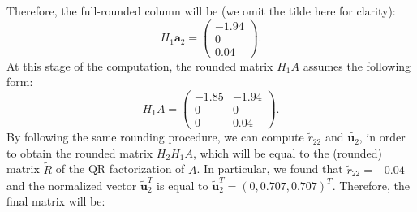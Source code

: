 \documentclass[a4paper,11pt]{article}
\begin{document}
Therefore, the full-rounded column will be (we omit the tilde here for clarity):
\begin{equation}
	H_1 \textbf{a}_2  =
	\begin{pmatrix}
		-1.94\\
		0\\
		0.04
	\end{pmatrix}.
\end{equation}
At this stage of the computation, the rounded matrix $H_{1}A$ assumes the following form:
\begin{equation}\label{key}
	H_1 A = \begin{pmatrix}
		-1.85& -1.94 \\
		0& 0  \\
		0& 0.04
	\end{pmatrix}. 
\end{equation}
By following the same rounding procedure, we can compute $\tilde{r}_{22}$ and $\tilde{\textbf{u}_{2}}$, in order to obtain the rounded matrix $H_{2}H_{1}A$, which will be equal to the (rounded) matrix $\tilde{R}$ of the QR factorization of $A$. In particular, we found that $\tilde{r}_{22} = -0.04$ and the normalized vector $\tilde{\textbf{u}}_2^{T}$ is equal to $\tilde{\textbf{u}}_2^{T} = (0, 0.707, 0.707)^{T}$. Therefore, the final matrix will be:
\end{document}

